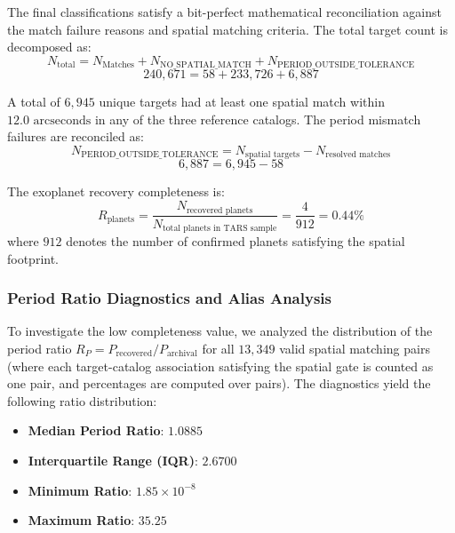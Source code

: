 The final classifications satisfy a bit-perfect mathematical reconciliation against the match failure reasons and spatial matching criteria. The total target count is decomposed as:
\begin{equation}
N_{\text{total}} = N_{\text{Matches}} + N_{\text{NO\_SPATIAL\_MATCH}} + N_{\text{PERIOD\_OUTSIDE\_TOLERANCE}}
\end{equation}
$$240,671 = 58 + 233,726 + 6,887$$

A total of $6,945$ unique targets had at least one spatial match within $12.0\text{ arcseconds}$ in any of the three reference catalogs. The period mismatch failures are reconciled as:
\begin{equation}
N_{\text{PERIOD\_OUTSIDE\_TOLERANCE}} = N_{\text{spatial targets}} - N_{\text{resolved matches}}
\end{equation}
$$6,887 = 6,945 - 58$$

The exoplanet recovery completeness is:
\begin{equation}
R_{\text{planets}} = \frac{N_{\text{recovered planets}}}{N_{\text{total planets in TARS sample}}} = \frac{4}{912} = 0.44\%
\end{equation}
where $912$ denotes the number of confirmed planets satisfying the spatial footprint.

\subsubsection{Period Ratio Diagnostics and Alias Analysis}
To investigate the low completeness value, we analyzed the distribution of the period ratio $R_P = P_{\text{recovered}} / P_{\text{archival}}$ for all $13,349$ valid spatial matching pairs (where each target-catalog association satisfying the spatial gate is counted as one pair, and percentages are computed over pairs). The diagnostics yield the following ratio distribution:
\begin{itemize}
    \item \textbf{Median Period Ratio}: $1.0885$
    \item \textbf{Interquartile Range (IQR)}: $2.6700$
    \item \textbf{Minimum Ratio}: $1.85 \times 10^{-8}$
    \item \textbf{Maximum Ratio}: $35.25$
\end{itemize}

